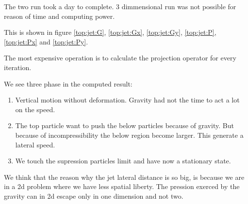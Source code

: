 The two run took a day to complete. 3 dimmensional run was not possible for reason of time and
computing power.

This is shown in figure \ref{top:jet:G}, \ref{top:jet:Gx}, \ref{top:jet:Gy}, \ref{top:jet:P}, \ref{top:jet:Px} and
\ref{top:jet:Py}.

The most expensive operation is to calculate the projection operator for every iteration.

We see three phase in the computed result:
\begin{enumerate}
 \item Vertical motion without deformation. Gravity had not the time to act a lot on the speed.
 \item The top particle want to push the below particles because of gravity.
 But because of incompressibility the below region become larger. This generate
 a lateral speed.
 \item We touch the supression particles limit and have now a stationary state.
\end{enumerate}

We think that the reason why the jet lateral distance is so big, is because we are in a 2d problem where
we have less spatial liberty. The pression exerced by the gravity can in 2d escape only in one dimension
and not two.

